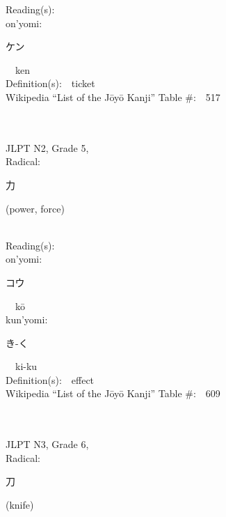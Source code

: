 \begin{multicols}{2}
Reading(s):\ \ \\
{\hspace*{1em}}on'yomi:\ \ \\
{\hspace*{2em}}{\begin{CJK}{UTF8}{min} ケン \end{CJK}}\ \ ken\ \ \\
Definition(s):\ \ ticket \\
Wikipedia ``List of the J\=oy\=o Kanji'' Table \#:\ \ 517 \\
\ \ \\
{\fontsize{34pt}{40pt}  }\ \ \\  %
{JLPT N2, Grade 5, \\Radical:\ \ {\begin{CJK}{UTF8}{min} 力 \end{CJK}} (power, force) } \\
Reading(s):\ \ \\
{\hspace*{1em}}on'yomi:\ \ \\
{\hspace*{2em}}{\begin{CJK}{UTF8}{min} コウ \end{CJK}}\ \ k\=o\ \ \\
{\hspace*{1em}}kun'yomi:\ \ \\
{\hspace*{2em}}{\begin{CJK}{UTF8}{min} き-く \end{CJK}}\ \ ki-ku\ \ \\
Definition(s):\ \ effect \\
Wikipedia ``List of the J\=oy\=o Kanji'' Table \#:\ \ 609 \\
\ \ \\
{\fontsize{34pt}{40pt}  }\ \ \\  %
{JLPT N3, Grade 6, \\Radical:\ \ {\begin{CJK}{UTF8}{min} 刀 \end{CJK}} (knife) } \\

\end{multicols}
